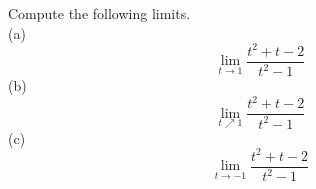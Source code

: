 Compute the following limits.\\
(a)
\begin{equation*}
  \lim_{t\rightarrow 1} \frac{t^2+t-2}{t^2-1}
\end{equation*}
(b)
\begin{equation*}
  \lim_{t\nearrow 1} \frac{t^2+t-2}{t^2-1}
\end{equation*}
(c)
\begin{equation*}
  \lim_{t\rightarrow -1} \frac{t^2+t-2}{t^2-1}
\end{equation*}
\answercheck
